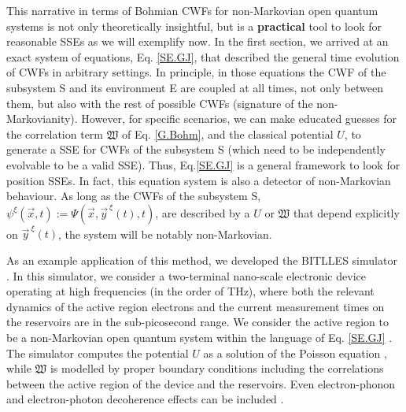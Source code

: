 \documentclass[11pt, a4paper]{article} %
\begin{document}
This narrative in terms of Bohmian CWFs for non-Markovian open quantum systems is not only theoretically insightful, but is a {\bf practical} tool to look for reasonable SSEs as we will exemplify now. In the first section, we arrived at an exact system of equations, Eq. \eqref{SE.GJ}, that described the general time evolution of CWFs in arbitrary settings. In principle, in those equations the CWF of the subsystem S and its environment E are coupled at all times, not only between them, but also with the rest of possible CWFs (signature of the non-Markovianity). However, for specific scenarios, we can make educated guesses for the correlation term $\mathfrak{W}$ of Eq. \eqref{G.Bohm}, and the classical potential $U$, to generate a SSE for CWFs of the subsystem S (which need to be independently evolvable to be a valid SSE). Thus, Eq.\eqref{SE.GJ} is a general framework to look for position SSEs. In fact, this equation system is also a detector of non-Markovian behaviour. As long as the CWFs of the subsystem S, $\psi^\xi(\vec{x},t):=\Psi(\vec{x},\vec{y}^{\:\xi}(t),t)$, are described by a $U$ or $\mathfrak{W}$ that depend explicitly on $\vec{y}^{\:\xi}(t)$, the system will be notably non-Markovian.

As an example application of this method, we developed the BITLLES simulator \cite{tdp,Pois,Thz}. In this simulator, we consider a two-terminal nano-scale electronic device operating at high frequencies (in the order of THz), where both the relevant dynamics of the active region electrons and the current measurement times on the reservoirs are in the sub-picosecond range. We consider the active region to be a non-Markovian open quantum system within the language of Eq. \eqref{SE.GJ} \cite{Thz}. The simulator computes the potential $U$ as a solution of the Poisson equation \cite{Pois}, while $\mathfrak{W}$ is modelled by proper boundary conditions \cite{boundary1, Pois} including the correlations between the active region of the device and the reservoirs. Even electron-phonon and electron-photon decoherence effects can be included \cite{eph, Matteo}.\vspace{-0.1cm}
\end{document}
